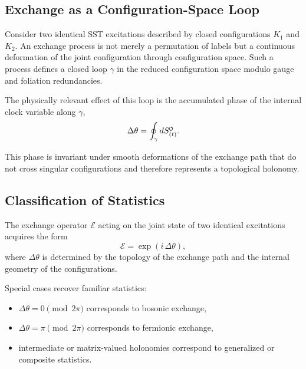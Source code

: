 \documentclass[11pt]{article}
\newcommand{\SwirlClock}{S_{(t)}^{\mkern-2mu\scriptscriptstyle\boldsymbol{\circlearrowleft}}}
\begin{document}
        \subsection{Exchange as a Configuration-Space Loop}

            Consider two identical SST excitations described by closed configurations
            $K_1$ and $K_2$.
            An exchange process is not merely a permutation of labels but a continuous
            deformation of the joint configuration through configuration space.
            Such a process defines a closed loop $\gamma$ in the reduced configuration
            space modulo gauge and foliation redundancies.

            The physically relevant effect of this loop is the accumulated phase of the
            internal clock variable along $\gamma$,
            \begin{equation}
                \Delta \theta
                =
                \oint_{\gamma} d\SwirlClock .
            \end{equation}

            This phase is invariant under smooth deformations of the exchange path that do
            not cross singular configurations and therefore represents a topological
            holonomy.

        \subsection{Classification of Statistics}

            The exchange operator $\mathcal{E}$ acting on the joint state of two identical
            excitations acquires the form
            \begin{equation}
                \mathcal{E}
                =
                \exp\!\left(i\,\Delta \theta\right),
            \end{equation}
            where $\Delta\theta$ is determined by the topology of the exchange path and the
            internal geometry of the configurations.

            Special cases recover familiar statistics:
            \begin{itemize}
                \item $\Delta\theta = 0 \pmod{2\pi}$ corresponds to bosonic exchange,
                \item $\Delta\theta = \pi \pmod{2\pi}$ corresponds to fermionic exchange,
                \item intermediate or matrix-valued holonomies correspond to generalized or
                composite statistics.
            \end{itemize}
\end{document}
